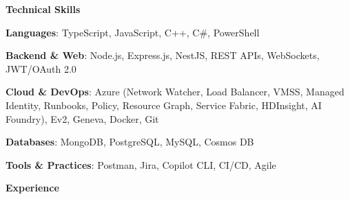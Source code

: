 \documentclass[a4paper,10pt]{article}
\newcommand{\cvsection}[1]{%
  \vspace{4.5mm} %
  \begin{tcolorbox}
    \textbf{\large #1}
  \end{tcolorbox}
  \vspace{-6mm}
}
\begin{document}
  \cvsection{Technical Skills}
  \vspace{10pt}
  \begin{itemize}[leftmargin=0.05in, label={}, itemsep=2.5pt]
    \small{
      \item \textbf{Languages}{: TypeScript, JavaScript, C++, C\#, PowerShell}
      \item \textbf{Backend \& Web}{: Node.js, Express.js, NestJS, REST APIs, WebSockets, JWT/OAuth 2.0}
      \item \textbf{Cloud \& DevOps}{: Azure (Network Watcher, Load Balancer, VMSS, Managed Identity, Runbooks, Policy, Resource Graph, Service Fabric, HDInsight, AI Foundry), Ev2, Geneva, Docker, Git}
      \item \textbf{Databases}{: MongoDB, PostgreSQL, MySQL, Cosmos DB}
      \item \textbf{Tools \& Practices}{: Postman, Jira, Copilot CLI, CI/CD, Agile}
    }
  \end{itemize}
\vspace{-9pt}
\cvsection{Experience}
\vspace{10pt}
\end{document}
